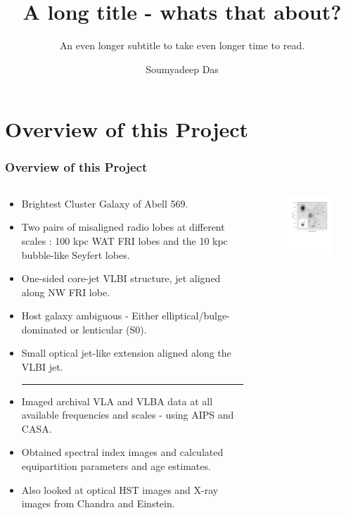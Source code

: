 \documentclass[10pt]{beamer}
\title[Short title]{A long title - whats that about?}
\subtitle{{\color{gray} \small An even longer subtitle to take even longer time to read.}}
\author[Soumyadeep Das]{Soumyadeep Das}
\institute[Uni of Hertfordshire]{Centre for Astrophysics Research (CAR)\\University of Hertfordshire\\Hatfield (United Kingdom).}
\date{}
\newcommand\Fontvii{\fontsize{7}{8.4}\selectfont}
\begin{document}
{
  
  \begin{frame}
    \titlepage
  \end{frame}
}


\section{Overview of this Project}
\begin{frame}
\frametitle{Overview of this Project}
\Fontvii
\begin{columns}[T] %
\begin{column}{.40\textwidth}
\begin{itemize}
  \item Brightest Cluster Galaxy of Abell 569.
  \item Two pairs of misaligned radio lobes at different scales : 100 kpc WAT FRI lobes and the 10 kpc bubble-like Seyfert lobes.
  \item One-sided core-jet VLBI structure, jet aligned along NW FRI lobe.
  \item Host galaxy ambiguous -  Either elliptical/bulge-dominated or lenticular (S0).
  \item Small optical jet-like extension aligned along the VLBI jet.
  \vspace*{0.2cm}
  {\color{gray} \hrule}
  \vspace*{0.1cm}
  \item Imaged archival VLA and VLBA data at all available frequencies and scales - using AIPS and CASA. 
  \item Obtained spectral index images and calculated equipartition parameters and age estimates.
  \item Also looked at optical HST images and X-ray images from Chandra and Einstein.
\end{itemize}
\end{column}%
\hfill%
\begin{column}{.59\textwidth}
\begin{figure}[htbp]
\vspace*{-1cm}
\centering
\includegraphics[trim=2.8cm 10.4cm 1.6cm 2.0cm,clip,width=6.5cm]{combined.pdf}

\end{figure}
\end{column}
\end{columns}
\end{frame}
\end{document}
